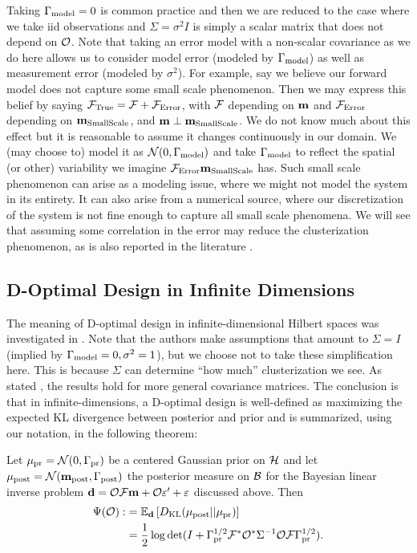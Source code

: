\documentclass{amsart}
\numberwithin{equation}{section}
\begin{document}
Taking $\Gamma_{\textup{model}} = 0$ is common practice
\cite{Tarantola05,KaipioSomersalo05,Vogel02} and then we are reduced
to the case where we take iid observations and $\Sigma = \sigma^2I$ is
simply a scalar matrix that does not depend on $\mathcal{O}$. Note that
taking an error model with a non-scalar covariance as we do here
allows us to consider model error (modeled by $\Gamma_{\textup{model}}$) as well as
measurement error (modeled by $\sigma^2$). For example, say we believe
our forward model does not capture some small scale phenomenon.  Then
we may express this belief by saying $\mathcal{F}_{\textup{True}} = \mathcal{F} + \mathcal{F}_{\textup{Error}}$, with $\mathcal{F}$
depending on $\mathbf{m}$ and $\mathcal{F}_{\textup{Error}}$ depending on $\mathbf{m}_{\textup{SmallScale}}$, and $\mathbf{m}
\perp \mathbf{m}_{\textup{SmallScale}}$. We do not know much about this effect but it is
reasonable to assume it changes continuously in our domain. We (may
choose to) model it as $\mathcal{N} (0, \Gamma_{\textup{model}})$ and take $\Gamma_{\textup{model}}$ to
reflect the spatial (or other) variability we imagine $\mathcal{F}_{\textup{Error}} \mathbf{m}_{\textup{SmallScale}}$
has. Such small scale phenomenon can arise as a modeling issue, where
we might not model the system in its entirety. It can also arise from
a numerical source, where our discretization of the system is not fine
enough to capture all small scale phenomena. We will see that assuming
some correlation in the error may reduce the clusterization
phenomenon, as is also reported in the literature \cite{Ucinski05}.

\subsection{D-Optimal Design in Infinite Dimensions}\label{subsec:D optimal design} 
The meaning of D-optimal design in infinite-dimensional Hilbert spaces
was investigated in \cite{AlexanderianGloorGhattas14}. Note that the
authors make assumptions that amount to $\Sigma=I$ (implied by
$\Gamma_{\textup{model}} = 0,\sigma^2=1$), but we choose not to take these
simplification here. This is because $\Sigma$ can determine ``how
much'' clusterization we see. As stated
\cite[pp. 681]{AlexanderianGloorGhattas14}, the results hold for more
general covariance matrices. The conclusion is that in
infinite-dimensions, a D-optimal design is well-defined as maximizing
the expected KL divergence between posterior and prior
 and is summarized, using our notation,
in the following theorem:
\begin{theorem}
  Let $\mu_{\textup{pr}} = \mathcal{N}(0,\Gamma_{\textup{pr}})$ be a centered Gaussian prior
  on $\mathcal{H}$   and let $\mu_{\textup{post}} = \mathcal{N}(\mathbf{m}_{\textup{post}},\Gamma_{\textup{post}})$ 
  the posterior measure on $\mathcal{B}$ for the Bayesian linear
  inverse problem $\mathbf{d} =  \mathcal{O} \mathcal{F}\mathbf{m} + \mathcal{O} \varepsilon' + \varepsilon$ discussed
  above. Then 
  \begin{align}\label{eq:objective}
    \begin{split}
      \Psi( \mathcal{O}) :&= \mathbb{E}_{\mathbf{d}}\left [ D_{\text{KL}} (\mu_{\textup{post}} || \mu_{\textup{pr}} ) \right ] \\
      &= \frac12 \log \det 
      ( I + \Gamma_{\textup{pr}}^{1/2}  \mathcal{F} ^* \mathcal{O}^* \Sigma^{-1} \mathcal{O} \mathcal{F} \Gamma_{\textup{pr}}^{1/2}).
    \end{split}
  \end{align}
\end{theorem}
\end{document}
